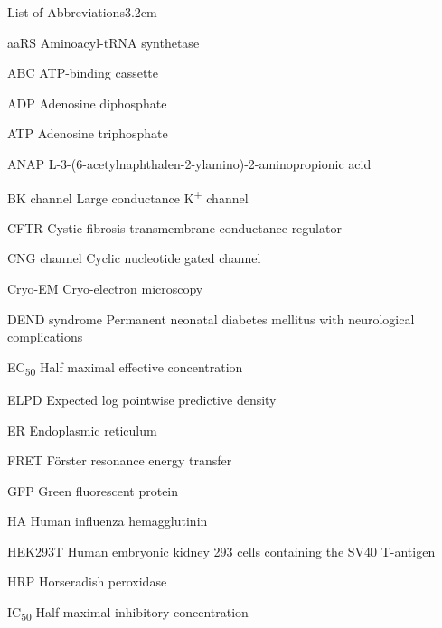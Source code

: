 \graphicspath{{figures/appendix/}}

\begin{mclistof}{List of Abbreviations}{3.2cm}

\item[aaRS] Aminoacyl-tRNA synthetase

\item[ABC] ATP-binding cassette

\item[ADP] Adenosine diphosphate

\item[ATP] Adenosine triphosphate

\item[ANAP] L-3-(6-acetylnaphthalen-2-ylamino)-2-aminopropionic acid

\item[BK channel] Large conductance K\textsuperscript{+} channel

\item[CFTR] Cystic fibrosis transmembrane conductance regulator

\item[CNG channel] Cyclic nucleotide gated channel

\item[Cryo-EM] Cryo-electron microscopy

\item[DEND syndrome] Permanent neonatal diabetes mellitus with neurological complications

\item[EC\textsubscript{50}] Half maximal effective concentration

\item[ELPD] Expected log pointwise predictive density

\item[ER] Endoplasmic reticulum

\item[FRET] F\"{o}rster resonance energy transfer

\item[GFP] Green fluorescent protein

\item[HA] Human influenza hemagglutinin

\item[HEK293T] Human embryonic kidney 293 cells containing the SV40 T-antigen

\item[HRP] Horseradish peroxidase

\item[IC\textsubscript{50}] Half maximal inhibitory concentration


\end{mclistof}
